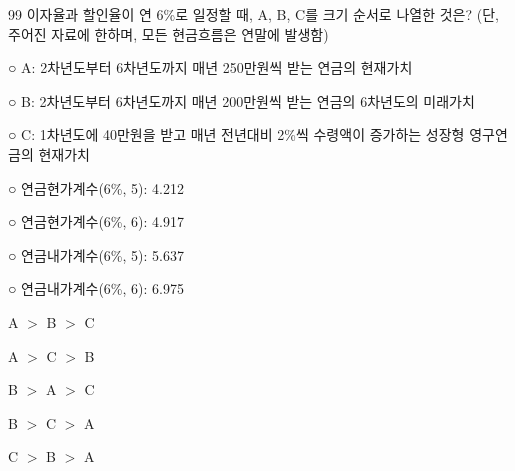 \begin{question}{99}
이자율과 할인율이 연 6\%로 일정할 때, A, B, C를 크기 순서로 나열한 것은? (단, 주어진 자료에 한하며, 모든 현금흐름은 연말에 발생함)
\begin{framedtext}
○ A: 2차년도부터 6차년도까지 매년 250만원씩 받는 연금의 현재가치 \par
○ B: 2차년도부터 6차년도까지 매년 200만원씩 받는 연금의 6차년도의 미래가치 \par
○ C: 1차년도에 40만원을 받고 매년 전년대비 2\%씩 수령액이 증가하는 성장형 영구연금의 현재가치 \par
○ 연금현가계수(6\%, 5): 4.212 \par
○ 연금현가계수(6\%, 6): 4.917 \par
○ 연금내가계수(6\%, 5): 5.637 \par
○ 연금내가계수(6\%, 6): 6.975
\end{framedtext}
\begin{choices}
  \item A $>$ B $>$ C
  \item A $>$ C $>$ B
  \item B $>$ A $>$ C
  \item B $>$ C $>$ A
  \item C $>$ B $>$ A
\end{choices}
\end{question}
